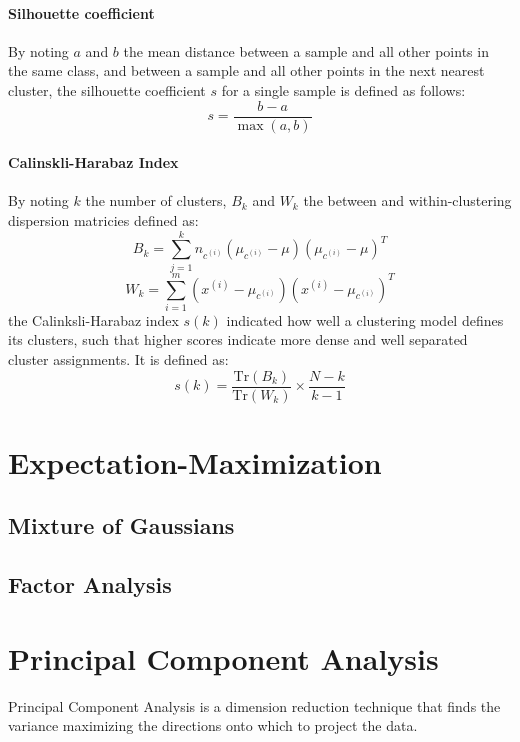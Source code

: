 \documentclass[twoside,twocolumn]{article}
\begin{document}
\paragraph{Silhouette coefficient} By noting $a$ and $b$ the
mean distance between a sample and all other points in the same class,
and between a sample and all other points in the next nearest cluster,
the silhouette coefficient $s$ for a single sample is defined as follows:
\begin{equation}
  s = \frac{b - a}{\max(a, b)}
\end{equation}
\paragraph{Calinskli-Harabaz Index} By noting $k$ the number of clusters, $B_k$
and $W_k$ the between and within-clustering dispersion matricies defined as:
\begin{equation}
  B_k=\sum_{j=1}^kn_{c^{(i)}}(\mu_{c^{(i)}}-\mu)(\mu_{c^{(i)}}-\mu)^T
\end{equation}
\begin{equation}
  W_k=\sum_{i=1}^m(x^{(i)}-\mu_{c^{(i)}})(x^{(i)}-\mu_{c^{(i)}})^T
\end{equation}
the Calinksli-Harabaz index $s(k)$ indicated how well a clustering model
defines its clusters, such that higher scores indicate more dense and well
separated cluster assignments. It is defined as:
\begin{equation}
  s(k)=\frac{\textrm{Tr}(B_k)}{\textrm{Tr}(W_k)}\times\frac{N-k}{k-1}
\end{equation}
\section{Expectation-Maximization}
\subsection{Mixture of Gaussians}
\subsection{Factor Analysis}
\section{Principal Component Analysis}
Principal Component Analysis is a dimension reduction technique that finds
the variance maximizing the directions onto which to project the data.
\end{document}
